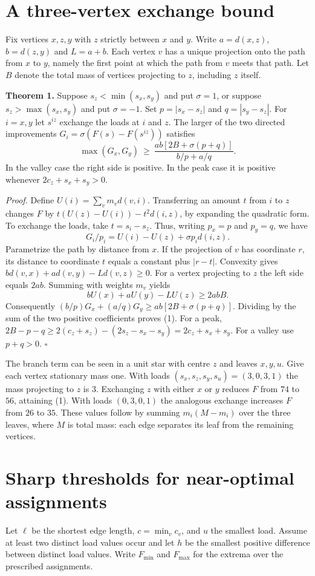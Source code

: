 \documentclass[11pt]{article}
\begin{document}
\section{A three-vertex exchange bound}
Fix vertices $x,z,y$ with $z$ strictly between $x$ and $y$. Write $a=d(x,z)$, $b=d(z,y)$ and $L=a+b$. Each vertex $v$ has a unique projection onto the path from $x$ to $y$, namely the first point at which the path from $v$ meets that path. Let $B$ denote the total mass of vertices projecting to $z$, including $z$ itself.

\textbf{Theorem 1.} Suppose $s_z<\min(s_x,s_y)$ and put $\sigma=1$, or suppose $s_z>\max(s_x,s_y)$ and put $\sigma=-1$. Set $p=|s_x-s_z|$ and $q=|s_y-s_z|$. For $i=x,y$ let $s^{iz}$ exchange the loads at $i$ and $z$. The larger of the two directed improvements $G_i=\sigma(F(s)-F(s^{iz}))$ satisfies
\[
 \max(G_x,G_y)\ \ge\ \frac{ab[2B+\sigma(p+q)]}{b/p+a/q}. \tag{1}
\]
In the valley case the right side is positive. In the peak case it is positive whenever $2c_z+s_x+s_y>0$.

\textit{Proof.} Define $U(i)=\sum_v m_vd(v,i)$. Transferring an amount $t$ from $i$ to $z$ changes $F$ by $t(U(z)-U(i))-t^2d(i,z)$, by expanding the quadratic form. To exchange the loads, take $t=s_i-s_z$. Thus, writing $p_x=p$ and $p_y=q$, we have
\[
 G_i/p_i=U(i)-U(z)+\sigma p_i d(i,z).
\]
Parametrize the path by distance from $x$. If the projection of $v$ has coordinate $r$, its distance to coordinate $t$ equals a constant plus $|r-t|$. Convexity gives $bd(v,x)+ad(v,y)-Ld(v,z)\ge0$. For a vertex projecting to $z$ the left side equals $2ab$. Summing with weights $m_v$ yields
\[
 bU(x)+aU(y)-LU(z)\ge 2abB .
\]
Consequently $(b/p)G_x+(a/q)G_y\ge ab[2B+\sigma(p+q)]$. Dividing by the sum of the two positive coefficients proves (1). For a peak, $2B-p-q\ge2(c_z+s_z)-(2s_z-s_x-s_y)=2c_z+s_x+s_y$. For a valley use $p+q>0$. $\square$

The branch term can be seen in a unit star with centre $z$ and leaves $x,y,u$. Give each vertex stationary mass one. With loads $(s_x,s_z,s_y,s_u)=(3,0,3,1)$ the mass projecting to $z$ is $3$. Exchanging $z$ with either $x$ or $y$ reduces $F$ from $74$ to $56$, attaining (1). With loads $(0,3,0,1)$ the analogous exchange increases $F$ from $26$ to $35$. These values follow by summing $m_i(M-m_i)$ over the three leaves, where $M$ is total mass: each edge separates its leaf from the remaining vertices.
\section{Sharp thresholds for near-optimal assignments}
Let $\ell$ be the shortest edge length, $c=\min_v c_v$, and $u$ the smallest load. Assume at least two distinct load values occur and let $h$ be the smallest positive difference between distinct load values. Write $F_{\min}$ and $F_{\max}$ for the extrema over the prescribed assignments.
\end{document}

